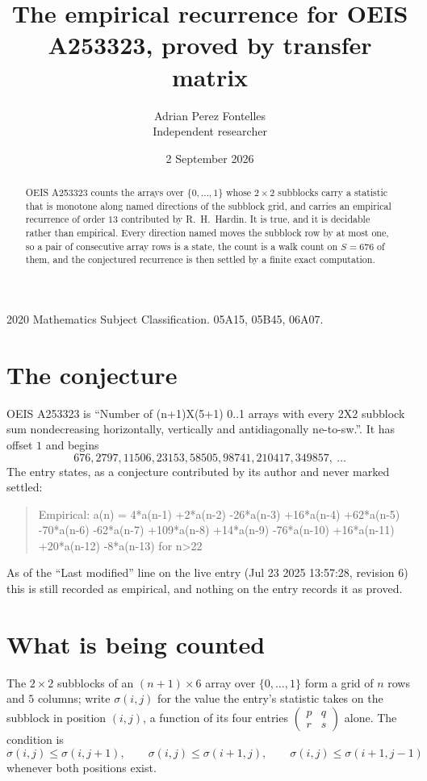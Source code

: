 \documentclass[11pt,a4paper]{article}
\title{The empirical recurrence for OEIS A253323, proved by transfer matrix}
\author{Adrian Perez Fontelles\\ \small Independent researcher}
\date{2 September 2026}
\theoremstyle{plain}
\theoremstyle{definition}
\begin{document}
\maketitle

\begin{abstract}
OEIS A253323 counts the arrays over $\{0,\dots,1\}$ whose $2\times2$ subblocks carry a
statistic that is monotone along named directions of the subblock grid, and carries an
empirical recurrence of order $13$ contributed by R.~H.~Hardin. It is true, and it is
decidable rather than empirical. Every direction named moves the subblock row by at most one,
so a pair of consecutive array rows is a state, the count is a walk count on $S=676$ of them,
and the conjectured recurrence is then settled by a finite exact computation.
\end{abstract}

\noindent\small 2020 Mathematics Subject Classification. 05A15, 05B45, 06A07.\normalsize

\section{The conjecture}

OEIS A253323 is ``Number of (n+1)X(5+1) 0..1 arrays with every 2X2 subblock sum nondecreasing horizontally, vertically and antidiagonally ne-to-sw.''. It has offset $1$ and begins
\[
676, 2797, 11506, 23153, 58505, 98741, 210417, 349857,\ \dots
\]
The entry states, as a conjecture contributed by its author and never marked settled:
\begin{quote}
Empirical: a(n) = 4*a(n-1) +2*a(n-2) -26*a(n-3) +16*a(n-4) +62*a(n-5) -70*a(n-6) -62*a(n-7) +109*a(n-8) +14*a(n-9) -76*a(n-10) +16*a(n-11) +20*a(n-12) -8*a(n-13) for n>22
\end{quote}
As of the ``Last modified'' line on the live entry (Jul 23 2025 13:57:28, revision 6) this is still
recorded as empirical, and nothing on the entry records it as proved.

\section{What is being counted}

The $2\times2$ subblocks of an $(n+1)\times6$ array over $\{0,\dots,1\}$ form a grid
of $n$ rows and $5$ columns; write $\sigma(i,j)$ for the value the entry's statistic takes on
the subblock in position $(i,j)$, a function of its four entries
$\begin{pmatrix}p&q\\r&s\end{pmatrix}$ alone. The condition is
\[
\sigma(i,j)\le\sigma(i,j+1),\qquad \sigma(i,j)\le\sigma(i+1,j),\qquad \sigma(i,j)\le\sigma(i+1,j-1)
\]
whenever both positions exist.
\end{document}
